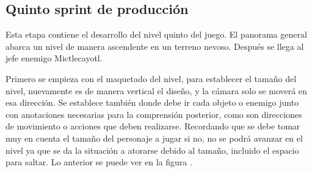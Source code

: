 
\subsection{Quinto sprint de producción}

Esta etapa contiene el desarrollo del nivel quinto del juego. El panorama general abarca un nivel de manera ascendente en un terreno nevoso. Después se llega al jefe enemigo Mictlecayotl.

Primero se empieza con el maquetado del nivel, para establecer el tamaño del nivel, nuevamente es de manera vertical el diseño, y la cámara solo se moverá en esa dirección. Se establece también donde debe ir cada objeto o enemigo junto con anotaciones necesarias para la comprensión posterior, como son direcciones de movimiento o acciones que deben realizarse. Recordando que se debe tomar muy en cuenta el tamaño del personaje a jugar si no, no se podrá avanzar en el nivel ya que se da la situación a atorarse debido al tamaño, incluido el espacio para saltar. Lo anterior se puede ver en la figura \cite{fig:n501}.
